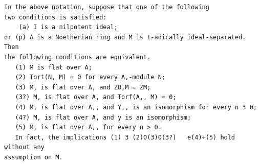 \begin{theorem}\label{mcrt-auto-theorem-22-3}\uses{}
\begin{verbatim}
In the above notation, suppose that one of the following
two conditions is satisfied:
    (a) I is a nilpotent ideal;
or (p) A is a Noetherian ring and M is I-adically ideal-separated. Then
the following conditions are equivalent.
   (1) M is flat over A;
   (2) Tort(N, M) = 0 for every A,-module N;
   (3) M, is flat over A, and ZO,M = ZM;
   (3?) M, is flat over A, and Torf(A,, M) = 0;
   (4) M, is flat over A,, and Y,, is an isomorphism for every n 3 0;
   (4?) M, is flat over A, and y is an isomorphism;
   (5) M, is flat over A,, for every n > 0.
   In fact, the implications (1) 3 (2)0(3)0(3?)   e(4)+(5) hold without any
assumption on M.
\end{verbatim}
\end{theorem}
